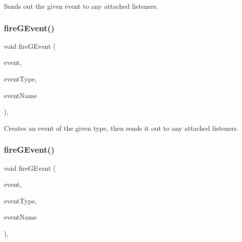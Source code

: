 Sends out the given event to any attached listeners. 

\mbox{\label{classsgl_1_1GObservable_ab3983ea07337b52020a29cc00c653d8d}} 
\subsubsection{\texorpdfstring{fire\+G\+Event()}{fireGEvent()}\hspace{0.1cm}{\footnotesize\ttfamily [1/8]}}
{\footnotesize\ttfamily void fire\+G\+Event (\begin{DoxyParamCaption}\item[{Q\+Event $\ast$}]{event,  }\item[{\mbox{\hyperlink{namespacesgl_a2628ea8d12e8b2563c32f05dc7fff6fa}{Event\+Type}}}]{event\+Type,  }\item[{const std\+::string \&}]{event\+Name }\end{DoxyParamCaption})\hspace{0.3cm}{\ttfamily [protected]}, {\ttfamily [virtual]}}



Creates an event of the given type, then sends it out to any attached listeners. 

\mbox{\label{classsgl_1_1GObservable_a01fdf1b0e0dbd49e189fe4514e010411}} 
\subsubsection{\texorpdfstring{fire\+G\+Event()}{fireGEvent()}\hspace{0.1cm}{\footnotesize\ttfamily [2/8]}}
{\footnotesize\ttfamily void fire\+G\+Event (\begin{DoxyParamCaption}\item[{Q\+Close\+Event $\ast$}]{event,  }\item[{\mbox{\hyperlink{namespacesgl_a2628ea8d12e8b2563c32f05dc7fff6fa}{Event\+Type}}}]{event\+Type,  }\item[{const std\+::string \&}]{event\+Name }\end{DoxyParamCaption})\hspace{0.3cm}{\ttfamily [protected]}, {\ttfamily [virtual]}}



